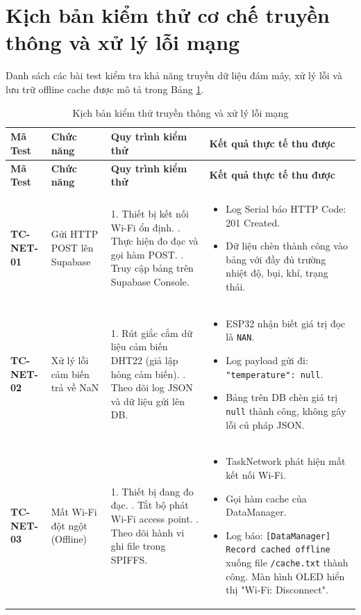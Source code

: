 \newpage
\section{Kịch bản kiểm thử cơ chế truyền thông và xử lý lỗi mạng}
Danh sách các bài test kiểm tra khả năng truyền dữ liệu đám mây, xử lý lỗi và lưu trữ offline cache được mô tả trong Bảng \ref{tab:testsuitenetwork}.

\begin{longtable}{llp{5.5cm}p{5.5cm}}
\caption{Kịch bản kiểm thử truyền thông và xử lý lỗi mạng} \label{tab:testsuitenetwork} \\
\toprule
\textbf{Mã Test} & \textbf{Chức năng} & \textbf{Quy trình kiểm thử} & \textbf{Kết quả thực tế thu được} \\
\midrule
\endfirsthead
\toprule
\textbf{Mã Test} & \textbf{Chức năng} & \textbf{Quy trình kiểm thử} & \textbf{Kết quả thực tế thu được} \\
\midrule
\endhead
\bottomrule
\endfoot
\bottomrule
\endlastfoot

\textbf{TC-NET-01} & Gửi HTTP POST lên Supabase &
1. Thiết bị kết nối Wi-Fi ổn định. \newline
2. Thực hiện đo đạc và gọi hàm POST. \newline
3. Truy cập bảng trên Supabase Console. &
\begin{itemize}
    \item Log Serial báo HTTP Code: 201 Created.
    \item Dữ liệu chèn thành công vào bảng với đầy đủ trường nhiệt độ, bụi, khí, trạng thái.
\end{itemize} \\
\midrule

\textbf{TC-NET-02} & Xử lý lỗi cảm biến trả về NaN &
1. Rút giắc cắm dữ liệu cảm biến DHT22 (giả lập hỏng cảm biến). \newline
2. Theo dõi log JSON và dữ liệu gửi lên DB. &
\begin{itemize}
    \item ESP32 nhận biết giá trị đọc là \texttt{NAN}.
    \item Log payload gửi đi: \texttt{"temperature": null}.
    \item Bảng trên DB chèn giá trị \texttt{null} thành công, không gây lỗi cú pháp JSON.
\end{itemize} \\
\midrule

\textbf{TC-NET-03} & Mất Wi-Fi đột ngột (Offline) &
1. Thiết bị đang đo đạc. \newline
2. Tắt bộ phát Wi-Fi access point. \newline
3. Theo dõi hành vi ghi file trong SPIFFS. &
\begin{itemize}
    \item TaskNetwork phát hiện mất kết nối Wi-Fi.
    \item Gọi hàm cache của DataManager.
    \item Log báo: \texttt{[DataManager] Record cached offline} xuống file \texttt{/cache.txt} thành công. Màn hình OLED hiển thị "Wi-Fi: Disconnect".
\end{itemize} \\
\midrule


\end{longtable}
